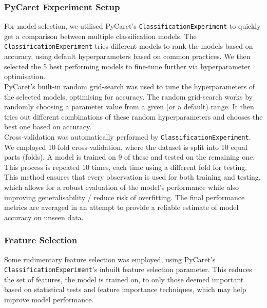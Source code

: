 \documentclass[a4paper,12pt]{article}
\begin{document}
\subsubsection{PyCaret Experiment Setup}
For model selection, we utilised PyCaret's \texttt{ClassificationExperiment} to quickly get a 
comparison between multiple classification models. The \texttt{ClassificationExperiment} tries 
different models to rank the models based on accuracy, using default hyperparameters based on common practices. 
We then selected the 5 best performing models to fine-tune further via hyperparameter optimisation. 
\\
PyCaret’s built-in random grid-search was used to tune the hyperparameters of the selected models, 
optimising for accuracy. The random grid-search works by 
randomly choosing a parameter value from a given (or a default) range. It then tries out different combinations
of these random hyperparameters and chooses the best one based on accuracy.
\\
Cross-validation was automatically performed by \texttt{ClassificationExperiment}. 
We employed 10-fold cross-validation, where the dataset is split into 10 equal parts (folds). 
A model is trained on 9 of these and tested on the remaining one. This process is repeated 10 times, 
each time using a different fold for testing. This method ensures that every observation is used for both training 
and testing, which allows for a robust evaluation of the model's performance while also improving generalisability / 
reduce risk of overfitting. The final performance metrics are averaged in an attempt to 
provide a reliable estimate of model accuracy on unseen data.



\subsubsection{Feature Selection}
Some rudimentary feature selection was employed, using PyCaret's \texttt{ClassificationExperiment}'s inbuilt
feature selection parameter. This reduces the set of features, the model is trained on, to only those deemed 
important based on statistical tests and feature importance techniques, which may help improve model 
performance.
\end{document}
